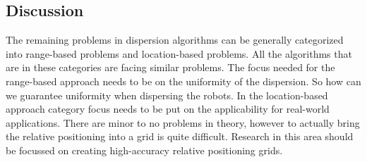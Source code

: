 \subsection{Discussion}
The remaining problems in dispersion algorithms can be generally categorized into range-based problems and location-based problems.
All the algorithms that are in these categories are facing similar problems.
The focus needed for the range-based approach needs to be on the uniformity of the dispersion. So how can we guarantee uniformity when dispersing the robots.
In the location-based approach category focus needs to be put on the applicability for real-world applications.
There are minor to no problems in theory, however to actually bring the relative positioning into a grid is quite difficult.
Research in this area should be focussed on creating high-accuracy relative positioning grids.
